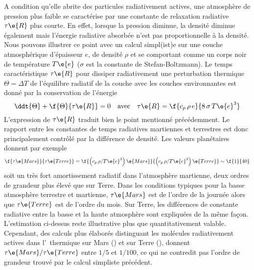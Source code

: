 A condition qu'elle abrite
des particules radiativement actives,
une atmosphère de pression
plus faible se caractérise par une constante
de relaxation radiative $\tau\e{R}$ plus
courte.
%
En effet, lorsque la pression
diminue, la densité diminue également
mais l'énergie radiative absorbée n'est
pas proportionnelle à la densité.
%
Nous pouvons illustrer ce point avec
un calcul simpl(ist)e sur une couche
atmosphérique d'épaisseur $e$, de densité $\rho$ 
et se comportant comme un corps noir
de température $T\e{e}$
($\sigma$ est la constante de Stefan-Boltzmann).
%
Le temps caractéristique $\tau\e{R}$ pour 
dissiper radiativement une
perturbation thermique $\Theta=\Delta T$
de l'équilibre radiatif de la couche
avec les couches environnantes est
donné par la conservation de l'énergie
\[
\ddt{\Theta} + \f{\Theta}{\tau\e{R}} = 0
\quad \textrm{avec} \quad
\tau\e{R} = \f{c_p \, \rho \, e}{8 \, \sigma \, T\e{e}^3}
\]
%
\noindent L'expression de $\tau\e{R}$ traduit
bien le point mentionné précédemment.
%
Le rapport entre les constantes
de temps radiatives martiennes et terrestres
est donc principalement contrôlé
par la différence de densité.
%
Les valeurs planétaires donnent par exemple
%
\[
\f{ \tau\e{Mars} }{ \tau\e{Terre} }
=
\f{ \left( c_p \, \rho / T\e{e}^3 \right)\e{Mars} }{ \left( c_p \, \rho / T\e{e}^3 \right)\e{Terre} }
\sim 
\f{1}{40}
\]
%
\noindent soit un très fort amortissement
radiatif dans l'atmosphère martienne, deux ordres
de grandeur plus élevé que sur Terre.
%
Dans les conditions typiques pour la basse
atmosphère terrestre et martienne, 
$\tau\e{Mars}$ est de l'ordre de la journée
alors que $\tau\e{Terre}$ est de l'ordre du mois.
%
Sur Terre, les différences de constante radiative
entre la basse et la haute atmosphère sont expliquées
de la même façon.
%
L'estimation ci-dessus reste illustrative plus que quantitativement
valable.
%
Cependant, des calculs plus élaborés 
distinguant les molécules radiativement actives 
dans l'\IR~thermique sur Mars (\carb) et sur Terre (\eau),
donnent $\tau\e{Mars}/\tau\e{Terre}$
entre $1/5$ et $1/100$, ce qui
ne contredit pas l'ordre de grandeur
trouvé par le calcul simpliste
précédent. 
%
%
